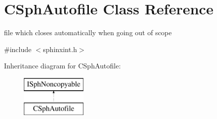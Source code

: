 \hypertarget{classCSphAutofile}{\section{C\-Sph\-Autofile Class Reference}
\label{classCSphAutofile}
}


file which closes automatically when going out of scope  




{\ttfamily \#include $<$sphinxint.\-h$>$}

Inheritance diagram for C\-Sph\-Autofile\-:\begin{figure}[H]
\begin{center}
\leavevmode
\includegraphics[height=2.000000cm]{classCSphAutofile}
\end{center}
\end{figure}
